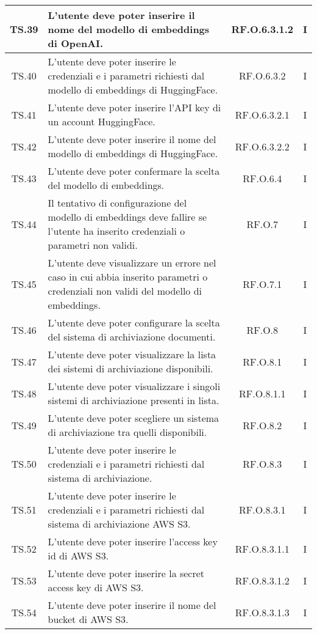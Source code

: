 {{{{{{{{{\begin{xltabular}{\textwidth}{|c|X|c|c|}
    \hline
    TS.39 & L’utente deve poter inserire il nome del modello di embeddings di OpenAI. & RF.O.6.3.1.2 & I \\
    \hline
    TS.40 & L’utente deve poter inserire le credenziali e i parametri richiesti dal modello di embeddings di HuggingFace. & RF.O.6.3.2 & I \\
    \hline
    TS.41 & L’utente deve poter inserire l’API key di un account HuggingFace. & RF.O.6.3.2.1 & I \\
    \hline
    TS.42 & L’utente deve poter inserire il nome del modello di embeddings di HuggingFace. & RF.O.6.3.2.2 & I \\
    \hline
    TS.43 & L’utente deve poter confermare la scelta del modello di embeddings. & RF.O.6.4 & I \\
    \hline
    TS.44 & Il tentativo di configurazione del modello di embeddings deve fallire se l’utente ha inserito credenziali o parametri non validi. & RF.O.7 & I \\
    \hline
    TS.45 & L’utente deve visualizzare un errore nel caso in cui abbia inserito parametri o credenziali non validi del modello di embeddings. & RF.O.7.1 & I \\
    \hline
    TS.46 & L’utente deve poter configurare la scelta del sistema di archiviazione documenti. & RF.O.8 & I \\
    \hline
    TS.47 & L’utente deve poter visualizzare la lista dei sistemi di archiviazione disponibili. & RF.O.8.1 & I \\
    \hline
    TS.48 & L’utente deve poter visualizzare i singoli sistemi di archiviazione presenti in lista. & RF.O.8.1.1 & I \\
    \hline
    TS.49 & L’utente deve poter scegliere un sistema di archiviazione tra quelli disponibili. & RF.O.8.2 & I \\
    \hline
    TS.50 & L’utente deve poter inserire le credenziali e i parametri richiesti dal sistema di archiviazione. & RF.O.8.3 & I \\
    \hline
    TS.51 & L’utente deve poter inserire le credenziali e i parametri richiesti dal sistema di archiviazione AWS S3. & RF.O.8.3.1 & I \\
    \hline
    TS.52 & L’utente deve poter inserire l’access key id di AWS S3. & RF.O.8.3.1.1 & I \\
    \hline
    TS.53 & L’utente deve poter inserire la secret access key di AWS S3. & RF.O.8.3.1.2 & I \\
    \hline
    TS.54 & L’utente deve poter inserire il nome del bucket di AWS S3. & RF.O.8.3.1.3 & I \\

\end{xltabular}}}}}}}}}}
